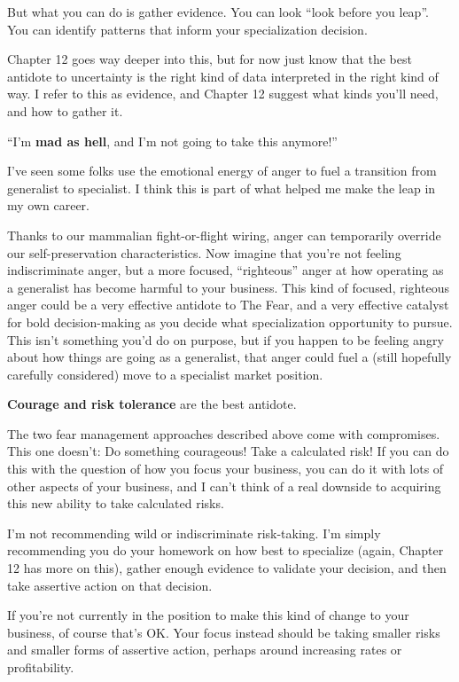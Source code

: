 But what you can do is gather evidence. You can look ``look before you leap''. You can identify patterns that inform your specialization decision.

Chapter 12 goes way deeper into this, but for now just know that the best antidote to uncertainty is the right kind of data interpreted in the right kind of way. I refer to this as evidence, and Chapter 12 suggest what kinds you'll need, and how to gather it.

``I'm \textbf{mad as hell}, and I'm not going to take this anymore!''

I've seen some folks use the emotional energy of anger to fuel a transition from generalist to specialist. I think this is part of what helped me make the leap in my own career.

Thanks to our mammalian fight-or-flight wiring, anger can temporarily override our self-preservation characteristics. Now imagine that you're not feeling indiscriminate anger, but a more focused, ``righteous'' anger at how operating as a generalist has become harmful to your business. This kind of focused, righteous anger could be a very effective antidote to The Fear, and a very effective catalyst for bold decision-making as you decide what specialization opportunity to pursue. This isn't something you'd do on purpose, but if you happen to be feeling angry about how things are going as a generalist, that anger could fuel a (still hopefully carefully considered) move to a specialist market position.

\textbf{Courage and risk tolerance} are the best antidote.

The two fear management approaches described above come with compromises. This one doesn't: Do something courageous! Take a calculated risk! If you can do this with the question of how you focus your business, you can do it with lots of other aspects of your business, and I can't think of a real downside to acquiring this new ability to take calculated risks.

I'm not recommending wild or indiscriminate risk-taking. I'm simply recommending you do your homework on how best to specialize (again, Chapter 12 has more on this), gather enough evidence to validate your decision, and then take assertive action on that decision.

If you're not currently in the position to make this kind of change to your business, of course that's OK. Your focus instead should be taking smaller risks and smaller forms of assertive action, perhaps around increasing rates or profitability.

